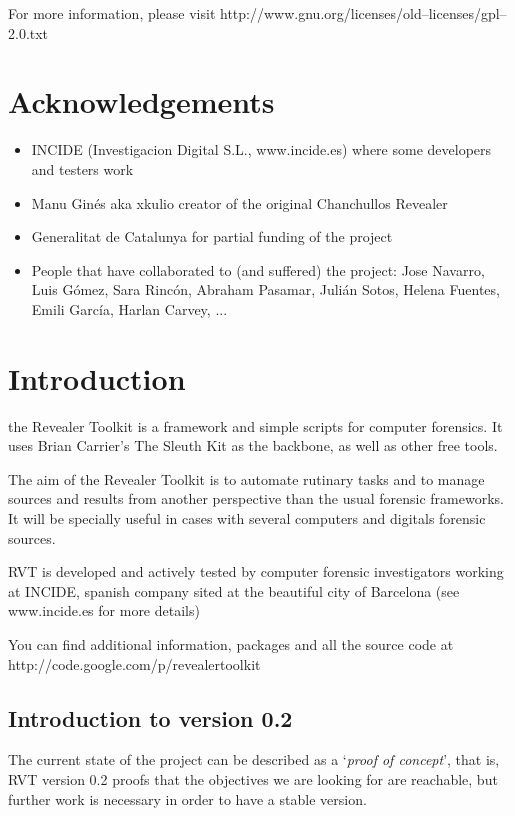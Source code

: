 \documentclass[a4paper,11pt,oneside]{report}
\begin{document}
     For more information, please visit
     http://www.gnu.org/licenses/old--licenses/gpl--2.0.txt


\chapter{Acknowledgements}

\begin{itemize}
     \item INCIDE (Investigacion Digital S.L., www.incide.es)
       where some developers and testers work
     \item Manu Ginés aka xkulio 
       creator of the original Chanchullos Revealer
     \item Generalitat de Catalunya
       for partial funding of the project
       
     \item People that have collaborated to (and suffered) the project:  Jose Navarro, Luis Gómez, Sara Rincón, Abraham Pasamar, Julián Sotos, Helena Fuentes, Emili García, Harlan Carvey, ... 
\end{itemize}



\chapter{Introduction}

the Revealer Toolkit is a framework and simple scripts for computer forensics. It uses Brian Carrier's The Sleuth Kit as the backbone, as well as other free tools.

The aim of the Revealer Toolkit is to automate rutinary tasks and to manage sources and results from another perspective than the usual forensic frameworks. It will be specially useful in cases with several computers and digitals forensic sources. 

RVT is developed and actively tested by computer forensic investigators working at INCIDE, spanish company sited at the beautiful city of Barcelona (see www.incide.es for more details)

You can find additional information, packages and all the source code at http://code.google.com/p/revealertoolkit


\section*{Introduction to version 0.2}

The current state of the project can be described as a `\emph{proof of concept}', that is, RVT version 0.2 proofs that the objectives we are looking for are reachable, but further work is necessary in order to have a stable version.
\end{document}
